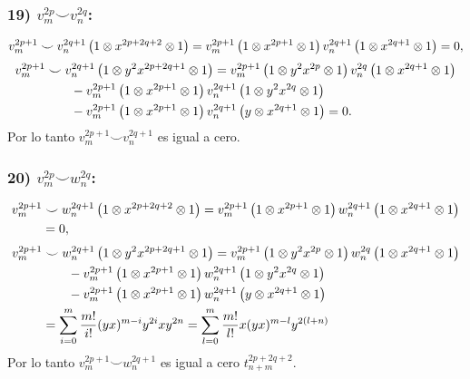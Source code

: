 \documentclass[fleqn,../tesis.tex]{subfiles}
\begin{document}
\subsubsection{19) $v_m^{2p} \smile v_n^{2q}$:}
\begin{align*}
	v_m^{2p + 1}\smile v_n^{2q + 1}\left(1\otimes x^{2p + 2q + 2} \otimes 1\right)
		= v_m^{2p + 1}\left(1\otimes x^{2p + 1}\otimes 1\right)v_n^{2q + 1}\left(1\otimes x^{2q + 1}\otimes 1\right)
		= 0,
\end{align*}
\begin{align*}
	v_m^{2p + 1} &\smile v_n^{2q + 1}\left(1\otimes y^2x^{2p + 2q  + 1} \otimes 1\right)
		= v_m^{2p + 1}\left(1\otimes y^2x^{2p}\otimes 1\right)v_n^{2q} \left(1\otimes x^{2q + 1}\otimes 1\right)\\
	&\qquad - v_m^{2p + 1}\left(1 \otimes x^{2p + 1} \otimes 1\right)
		v_n^{2q + 1}\left(1\otimes y^2x^{2q}\otimes 1\right)\\
	&\qquad - v_m^{2p + 1}\left(1 \otimes x^{2p + 1} \otimes 1\right)
		v_n^{2q + 1}\left(y\otimes x^{2q + 1}\otimes 1\right) = 0.
\end{align*}
Por lo tanto $v_m^{2p + 1}\smile v_n^{2q + 1}$ es igual a cero.
\subsubsection{20) $v_m^{2p} \smile w_n^{2q}$:}
\begin{align*}
	v_m^{2p + 1} &\smile w_n^{2q + 1}\left(1\otimes x^{2p + 2q + 2} \otimes 1\right)
		= v_m^{2p + 1}\left(1\otimes x^{2p + 1}\otimes 1\right)w_n^{2q + 1}\left(1\otimes x^{2q + 1}\otimes 1\right)\\
		&= 0,
\end{align*}
\begin{align*}
	v_m^{2p + 1} &\smile w_n^{2q + 1}\left(1\otimes y^2x^{2p + 2q  + 1} \otimes 1\right)
		= v_m^{2p + 1}\left(1\otimes y^2x^{2p}\otimes 1\right)w_n^{2q} \left(1\otimes x^{2q + 1}\otimes 1\right)\\
	&\qquad - v_m^{2p + 1}\left(1 \otimes x^{2p + 1} \otimes 1\right)
		w_n^{2q + 1}\left(1\otimes y^2x^{2q}\otimes 1\right)\\
	&\qquad - v_m^{2p + 1}\left(1 \otimes x^{2p + 1} \otimes 1\right)
		w_n^{2q + 1}\left(y\otimes x^{2q + 1}\otimes 1\right)\\
	&= \sum_{i = 0}^{m}\frac{m!}{i!}(yx)^{m - i}y^{2i}xy^{2n}
		=  \sum_{l = 0}^{m}\frac{m!}{l!}x(yx)^{m - l}y^{2(l + n)}
\end{align*}
Por lo tanto $v_m^{2p + 1}\smile w_n^{2q + 1}$ es igual a cero $t_{n + m}^{2p + 2q + 2}$.
\end{document}
